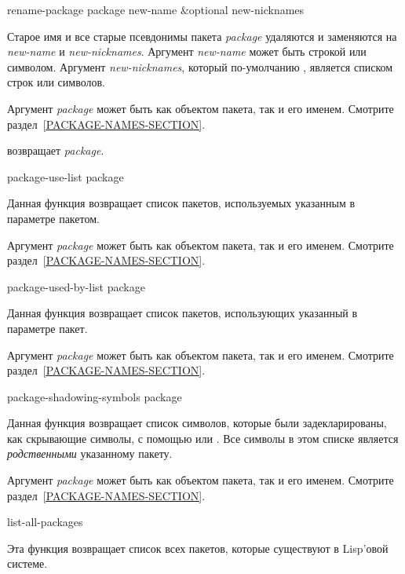 \begin{defun}[Функция]
rename-package package new-name &optional new-nicknames

Старое имя и все старые псевдонимы пакета \emph{package} удаляются и заменяются
на \emph{new-name} и \emph{new-nicknames}. Аргумент \emph{new-name} может быть
строкой или символом. Аргумент \emph{new-nicknames}, который по-умолчанию
{\false}, является списком строк или символов.

Аргумент \emph{package} может быть как объектом пакета, так и его
именем. Смотрите раздел~\ref{PACKAGE-NAMES-SECTION}.

 возвращает \emph{package}.
\end{defun}

\begin{defun}[Функция]
package-use-list package

Данная функция возвращает список пакетов, используемых указанным в параметре
пакетом.

Аргумент \emph{package} может быть как объектом пакета, так и его
именем. Смотрите раздел~\ref{PACKAGE-NAMES-SECTION}.
\end{defun}

\begin{defun}[Функция]
package-used-by-list package

Данная функция возвращает список пакетов, использующих указанный в параметре
пакет.

Аргумент \emph{package} может быть как объектом пакета, так и его
именем. Смотрите раздел~\ref{PACKAGE-NAMES-SECTION}.
\end{defun}

\begin{defun}[Функция]
package-shadowing-symbols package

Данная функция возвращает список символов, которые были задекларированы, как
скрывающие символы, с помощью  или . Все
символы в этом списке является \emph{родственными} указанному пакету.

Аргумент \emph{package} может быть как объектом пакета, так и его
именем. Смотрите раздел~\ref{PACKAGE-NAMES-SECTION}.
\end{defun}

\begin{defun}[Функция]
list-all-packages 

Эта функция возвращает список всех пакетов, которые существуют в Lisp'овой
системе. 
\end{defun}

